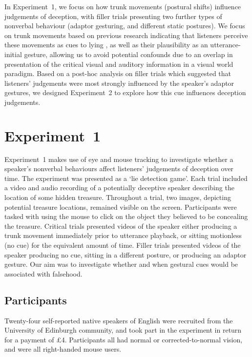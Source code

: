 \documentclass[a4paper,man,natbib]{apa6}
\begin{document}
In Experiment~1, we focus on how trunk movements (postural shifts) influence judgements of deception, with filler trials presenting two further types of nonverbal behaviour (adaptor gesturing, and different static postures).
We focus on trunk movements based on previous research indicating that listeners perceive these movements as cues to lying \citep{Vrij1996a, Zuckerman1981}, as well as their plausibility as an utterance-initial gesture, allowing us to avoid potential confounds due to an overlap in presentation of the critical visual and auditory information in a visual world paradigm.
Based on a post-hoc analysis on filler trials which suggested that listeners' judgements were most strongly influenced by the speaker's adaptor gestures, we designed Experiment~2 to explore how this cue influences deception judgements.

\section{Experiment~1}
Experiment~1 makes use of eye  and mouse tracking to investigate whether a speaker's nonverbal behaviours affect listeners' judgements of deception over time. 
The experiment was presented as a `lie detection game'.
Each trial included a video and audio recording of a potentially deceptive speaker describing the location of some hidden treasure.
Throughout a trial, two images, depicting potential treasure locations, remained visible on the screen. 
Participants were tasked with using the mouse to click on the object they believed to be concealing the treasure.
Critical trials presented videos of the speaker either producing a trunk movement immediately prior to utterance playback, or sitting motionless (no cue) for the equivalent amount of time.
Filler trials presented videos of the speaker producing no cue, sitting in a different posture, or producing an adaptor gesture. 
Our aim was to investigate whether and when gestural cues would be associated with falsehood.

\subsection{Participants}
Twenty-four self-reported native speakers of English were recruited from the University of Edinburgh community, and took part in the experiment in return for a payment of \pounds{}4.
Participants all had normal or corrected-to-normal vision, and were all right-handed mouse users.
\end{document}
